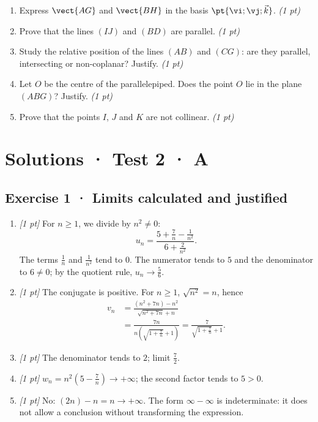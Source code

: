\begin{enumerate}

\item Express $\vect{AG}$ and $\vect{BH}$ in the basis $\pt{\vi;\vj;\vec k}$. \hfill\textit{(1 pt)}

\item Prove that the lines $(IJ)$ and $(BD)$ are parallel. \hfill\textit{(1 pt)}

\item Study the relative position of the lines $(AB)$ and $(CG)$: are they parallel, intersecting or non-coplanar? Justify. \hfill\textit{(1 pt)}

\item Let $O$ be the centre of the parallelepiped. Does the point $O$ lie in the plane $(ABG)$? Justify. \hfill\textit{(1 pt)}

\item Prove that the points $I$, $J$ and $K$ are not collinear. \hfill\textit{(1 pt)}

\end{enumerate}

\ifmxteacher\mxnewpage

\section*{Solutions · Test 2 · A}\label{cor:2-3}

\subsection*{Exercise 1 · Limits calculated and justified}\begin{enumerate}

\item \textit{[1 pt]} For $n\ge1$, we divide by $n^2\ne0$:
\[u_n=\frac{5+\frac{7}{n}-\frac{1}{n^2}}{6+\frac{2}{n^2}}.\]
The terms $\frac{1}{n}$ and $\frac{1}{n^2}$ tend to $0$. The numerator tends to $5$ and the denominator to $6\ne0$; by the quotient rule, $u_n\to\frac{5}{6}$.

\item \textit{[1 pt]} The conjugate is positive. For $n\ge1$, $\sqrt{n^2}=n$, hence
\[\begin{aligned}v_n&=\frac{(n^2+7n)-n^2}{\sqrt{n^2+7n}+n}\\&=\frac{7n}{n(\sqrt{1+\frac{7}{n}}+1)}=\frac{7}{\sqrt{1+\frac{7}{n}}+1}.\end{aligned}\]

\item \textit{[1 pt]} The denominator tends to $2$; limit $\frac{7}{2}$.

\item \textit{[1 pt]} $w_n=n^2(5-\frac{7}{n})\to+\infty$; the second factor tends to $5>0$.

\item \textit{[1 pt]} No: $(2n)-n=n\to+\infty$. The form $\infty-\infty$ is indeterminate: it does not allow a conclusion without transforming the expression.

\end{enumerate}

